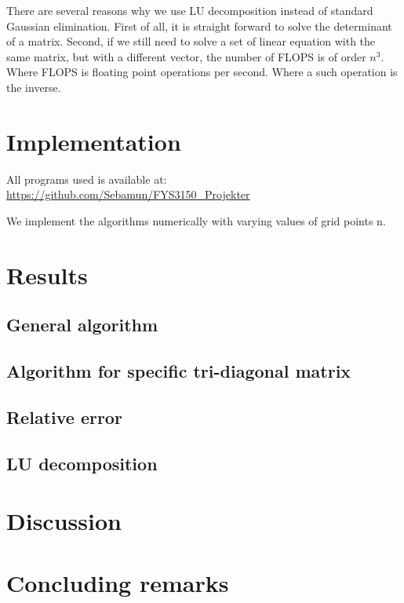 \documentclass[norsk,a4paper,12pt]{article}
\begin{document}
There are several reasons why we use LU decomposition instead of standard Gaussian elimination. First of all, it is straight forward to solve the determinant of a matrix. Second, if we still need to solve a set of linear equation with the same matrix, but with a different vector, the number of FLOPS is of order $n^3$. Where FLOPS is floating point operations per second. Where a such operation is the inverse. 




\section{Implementation}

All programs used is available at: \\
\url{https://github.com/Sebamun/FYS3150_Projekter}

We implement the algorithms numerically with varying values of grid points n. 

\section{Results}

\subsection{General algorithm}

\subsection{Algorithm for specific tri-diagonal matrix}

 \subsection{Relative error}
 
  \subsection{LU decomposition}
  
  \section{Discussion}
  
  


\section{Concluding remarks}


\end{document}
